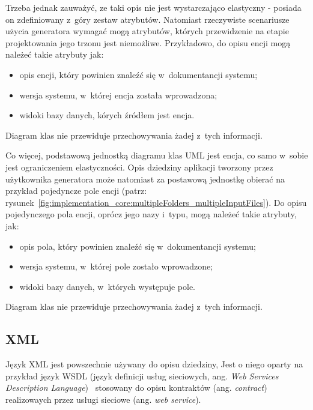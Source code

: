 

Trzeba jednak zauważyć, ze taki opis nie jest wystarczająco elastyczny - posiada on zdefiniowany z~góry zestaw atrybutów.
Natomiast rzeczywiste scenariusze użycia generatora wymagać mogą atrybutów, których przewidzenie na etapie projektowania jego trzonu jest niemożliwe.
Przykładowo, do opisu encji mogą należeć takie atrybuty jak:

\begin{itemize}
 \item opis encji, który powinien znaleźć się w~dokumentancji systemu;
 \item wersja systemu, w~której encja została wprowadzona;
 \item widoki bazy danych, kórych źródłem jest encja.
\end{itemize}

Diagram klas nie przewiduje przechowywania żadej z~tych informacji.

Co więcej, podstawową jednostką diagramu klas UML jest encja, co samo w~sobie jest ograniczeniem elastyczności.
Opis dziedziny aplikacji tworzony przez użytkownika generatora może natomiast za postawową jednostkę obierać na przykład pojedyncze pole encji (patrz: rysunek~\ref{fig:implementation_core:multipleFolders_multipleInputFiles}).
Do opisu pojedynczego pola encji, oprócz jego nazy i~typu, mogą należeć takie atrybuty, jak:

\begin{itemize}
 \item opis pola, który powinien znaleźć się w~dokumentancji systemu;
 \item wersja systemu, w~której pole zostało wprowadzone;
 \item widoki bazy danych, w~których występuje pole.
\end{itemize}

Diagram klas nie przewiduje przechowywania żadej z~tych informacji.


\subsection{XML}

Język XML jest powszechnie używany do opisu dziedziny,
Jest o niego oparty na przykład język WSDL (język definicji usług sieciowych, ang. \emph{Web Services Description Language})~\cite{wsdl} stosowany do opisu kontraktów (ang. \emph{contract}) realizowaych przez usługi sieciowe (ang. \emph{web service}).

